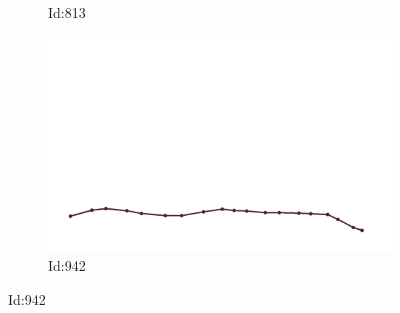 \documentclass[12pt,twoside]{report}
\begin{document}
\begin{figure}
\begin{subfigure}[b]{0.20\textwidth}
\caption{Id:813}
\end{subfigure}
\begin{subfigure}[b]{0.20\textwidth}
\centering
\includegraphics[width=\textwidth]{../../trajectories/942.png}
\caption{Id:942}
\end{subfigure}
\end{figure}
\end{document}
